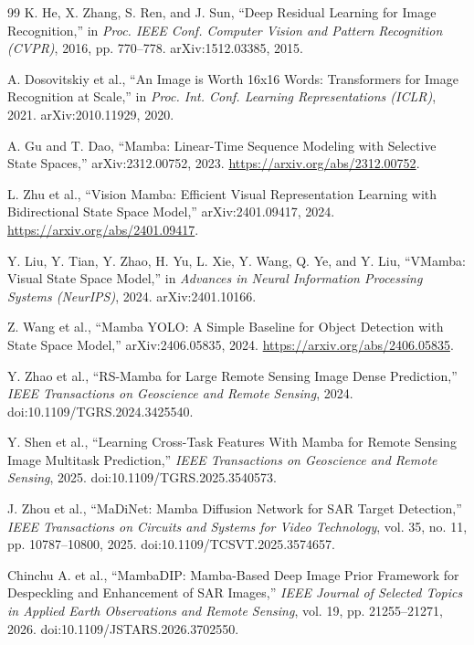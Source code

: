 \documentclass[journal]{IEEEtran}
\begin{document}
\begin{thebibliography}{99}
K. He, X. Zhang, S. Ren, and J. Sun, ``Deep Residual Learning for Image Recognition,'' in \emph{Proc. IEEE Conf. Computer Vision and Pattern Recognition (CVPR)}, 2016, pp. 770--778. arXiv:1512.03385, 2015.

A. Dosovitskiy et al., ``An Image is Worth 16x16 Words: Transformers for Image Recognition at Scale,'' in \emph{Proc. Int. Conf. Learning Representations (ICLR)}, 2021. arXiv:2010.11929, 2020.

A. Gu and T. Dao, ``Mamba: Linear-Time Sequence Modeling with Selective State Spaces,'' arXiv:2312.00752, 2023. \url{https://arxiv.org/abs/2312.00752}.

L. Zhu et al., ``Vision Mamba: Efficient Visual Representation Learning with Bidirectional State Space Model,'' arXiv:2401.09417, 2024. \url{https://arxiv.org/abs/2401.09417}.

Y. Liu, Y. Tian, Y. Zhao, H. Yu, L. Xie, Y. Wang, Q. Ye, and Y. Liu, ``VMamba: Visual State Space Model,'' in \emph{Advances in Neural Information Processing Systems (NeurIPS)}, 2024. arXiv:2401.10166.

Z. Wang et al., ``Mamba YOLO: A Simple Baseline for Object Detection with State Space Model,'' arXiv:2406.05835, 2024. \url{https://arxiv.org/abs/2406.05835}.

Y. Zhao et al., ``RS-Mamba for Large Remote Sensing Image Dense Prediction,'' \emph{IEEE Transactions on Geoscience and Remote Sensing}, 2024. doi:10.1109/TGRS.2024.3425540.

Y. Shen et al., ``Learning Cross-Task Features With Mamba for Remote Sensing Image Multitask Prediction,'' \emph{IEEE Transactions on Geoscience and Remote Sensing}, 2025. doi:10.1109/TGRS.2025.3540573.

J. Zhou et al., ``MaDiNet: Mamba Diffusion Network for SAR Target Detection,'' \emph{IEEE Transactions on Circuits and Systems for Video Technology}, vol. 35, no. 11, pp. 10787--10800, 2025. doi:10.1109/TCSVT.2025.3574657.

Chinchu A. et al., ``MambaDIP: Mamba-Based Deep Image Prior Framework for Despeckling and Enhancement of SAR Images,'' \emph{IEEE Journal of Selected Topics in Applied Earth Observations and Remote Sensing}, vol. 19, pp. 21255--21271, 2026. doi:10.1109/JSTARS.2026.3702550.


\end{thebibliography}
\end{document}

